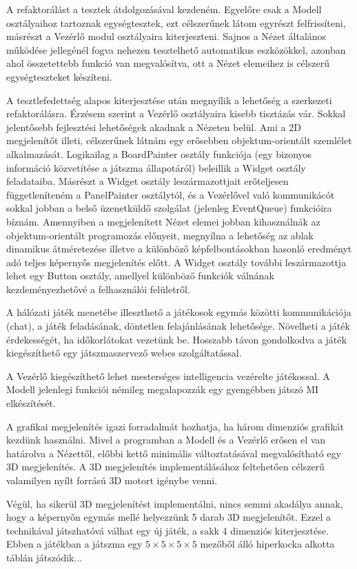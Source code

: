 \documentclass[12pt, twoside]{report}
\begin{document}
A refaktorálást a tesztek átdolgozásával kezdeném. Egyelőre csak a Modell osztályaihoz tartoznak egységtesztek, ezt célszerűnek látom egyrészt felfrissíteni, másrészt a Vezérlő modul osztályaira kiterjeszteni. Sajnos a Nézet általános működése jellegénél fogva nehezen tesztelhető automatikus eszközökkel, azonban ahol összetettebb funkció van megvalósítva, ott a Nézet elemeihez is célszerű egységteszteket készíteni.

A tesztlefedettség alapos kiterjesztése után megnyílik a lehetőség a szerkezeti refaktorálásra. Érzésem szerint a Vezérlő osztályaira kisebb tisztázás vár. Sokkal jelentősebb fejlesztési lehetőségek akadnak a Nézeten belül. Ami a 2D megjelenítőt illeti, célszerűnek látnám egy erősebben objektum-orientált szemlélet alkalmazását. Logikailag a BoardPainter osztály funkciója (egy bizonyos információ közvetítése a játszma állapotáról) beleillik a Widget osztály feladataiba. Másrészt a Widget osztály leszármazottjait erőteljesen függetleníteném a PanelPainter osztálytól, és a Vezérlővel való kommunikácót sokkal jobban a belső üzenetküldő szolgálat (jelenleg EventQueue) funkcióira bíznám. Amennyiben a megjelenített Nézet elemei jobban kihasználnák az objektum-orientált programozás előnyeit, megnyílna a lehetőség az ablak dinamikus átméretezése illetve a különböző képfelbontásokban hasonló eredményt adó teljes képernyős megjelenítés előtt. A Widget osztály további leszármazottja lehet egy Button osztály, amellyel különböző funkciók válnának kezdeményezhetővé a felhasználói felületről.

A hálózati játék menetébe illeszthető a játékosok egymás közötti kommunikációja (chat), a játék feladásának, döntetlen felajánlásának lehetősége. Növelheti a játék érdekességét, ha időkorlátokat vezetünk be. Hosszabb távon gondolkodva a játék kiegészíthető egy játszmaszervező webes szolgáltatással.

A Vezérlő kiegészíthető lehet mesterséges intelligencia vezérelte játékossal. A Modell jelenlegi funkciói némileg megalapozzák egy gyengébben játszó MI elkészítését.

A grafikai megjelenítés igazi forradalmát hozhatja, ha három dimenziós grafikát kezdünk használni. Mivel a programban a Modell és a Vezérlő erősen el van határolva a Nézettől, előbbi kettő minimális változtatásával megvalósítható egy 3D megjelenítés. A 3D megjelenítés implementálásához feltehetően célszerű valamilyen nyílt forrású 3D motort igénybe venni.

Végül, ha sikerül 3D megjelenítést implementálni, nincs semmi akadálya annak, hogy a képernyőn egymás mellé helyezzünk 5 darab 3D megjelenítőt. Ezzel a technikával játszhatóvá válhat egy új játék, a sakk 4 dimenziós kiterjesztése. Ebben a játékban a játszma egy $5 \times 5 \times 5 \times 5$ mezőből álló hiperkocka alkotta táblán játszódik... 
\end{document}
